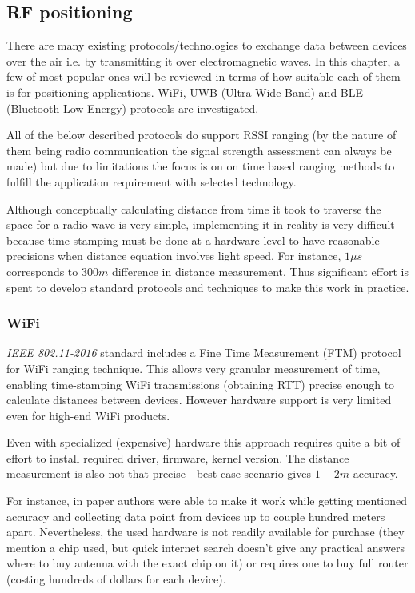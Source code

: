 \subsection{RF positioning}

There are many existing protocols/technologies to exchange data between devices over the air i.e. by transmitting it over electromagnetic waves. In this chapter, a few of most popular ones will be reviewed in terms of how suitable each of them is for positioning applications. WiFi, UWB (Ultra Wide Band) and BLE (Bluetooth Low Energy) protocols are investigated.

All of the below described protocols do support RSSI ranging (by the nature of them being radio communication the signal strength assessment can always be made) but due to limitations the focus is on on time based ranging methods to fulfill the application requirement with selected technology.

Although conceptually calculating distance from time it took to traverse the space for a radio wave is very simple, implementing it in reality is very difficult because time stamping must be done at a hardware level to have reasonable precisions when distance equation involves light speed. For instance, $1 \mu s$ corresponds to $300m$ difference in distance measurement. Thus significant effort is spent to develop standard protocols and techniques to make this work in practice.

\subsubsection{WiFi}

\emph{IEEE 802.11-2016} standard includes a Fine Time Measurement (FTM) protocol for WiFi ranging technique. This allows very granular measurement of time, enabling time-stamping WiFi transmissions (obtaining RTT) precise enough to calculate distances between devices. However hardware support is very limited even for high-end WiFi products.

Even with specialized (expensive) hardware this approach requires quite a bit of effort to install required driver, firmware, kernel version. The distance measurement is also not that precise - best case scenario gives $1-2m$ accuracy.

For instance, in paper \cite{ibrahim2018verification} authors were able to make it work while getting mentioned accuracy and collecting data point from devices up to couple hundred meters apart. Nevertheless, the used hardware is not readily available for purchase (they mention a chip used, but quick internet search doesn't give any practical answers where to buy antenna with the exact chip on it) or requires one to buy full router (costing hundreds of dollars for each device).

